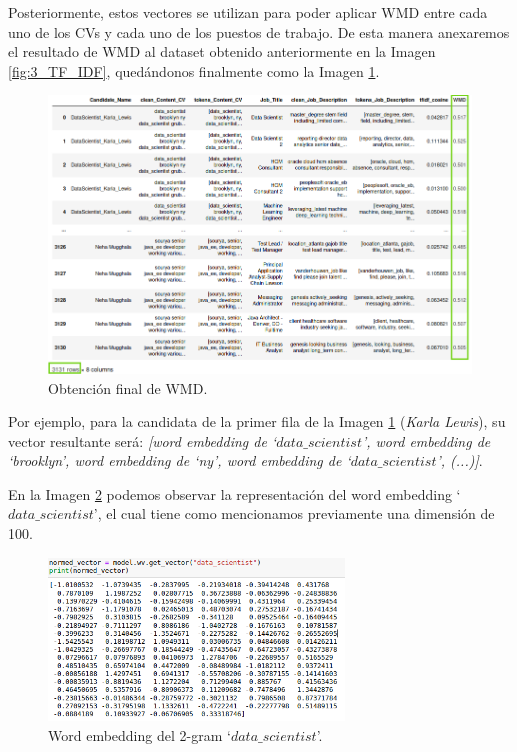 \documentclass[12pt,a4paper]{article}
\begin{document}
\begin{sloppypar}
Posteriormente, estos vectores se utilizan para poder aplicar WMD entre cada uno de los CVs y cada uno de los puestos de trabajo. De esta manera anexaremos el resultado de WMD al dataset obtenido anteriormente en la Imagen \ref{fig:3_TF_IDF}, quedándonos finalmente como la Imagen \ref{fig:7_Calculo_WMD}.

\begin{figure}[H] 
 \centering
 \includegraphics[width=1\textwidth]{images/implementacion_5/7_Calculo_WMD.png}
\captionsetup{justification=centering,margin=3cm}
 \caption{Obtención final de WMD.} 
 \label{fig:7_Calculo_WMD}
\end{figure}

\cleardoublepage

Por ejemplo, para la candidata de la primer fila de la Imagen \ref{fig:7_Calculo_WMD} (\textit{Karla Lewis}), su vector resultante será: \textit{[word embedding de ‘$data\_scientist$’, word embedding de ‘brooklyn’, word embedding de ‘ny’, word embedding de ‘$data\_scientist$’, (...)]}. 

En la Imagen \ref{fig:8_Word_emb} podemos observar la representación del word embedding ‘$data\_scientist$’, el cual tiene como mencionamos previamente una dimensión de 100. 

\begin{figure}[H] 
 \centering
 \includegraphics[width=0.7\textwidth]{images/implementacion_5/8_Word_emb.png}
\captionsetup{justification=centering,margin=3cm}
 \caption{Word embedding del 2-gram ‘$data\_scientist$’.} 
 \label{fig:8_Word_emb}
\end{figure}


\end{sloppypar}
\end{document}
